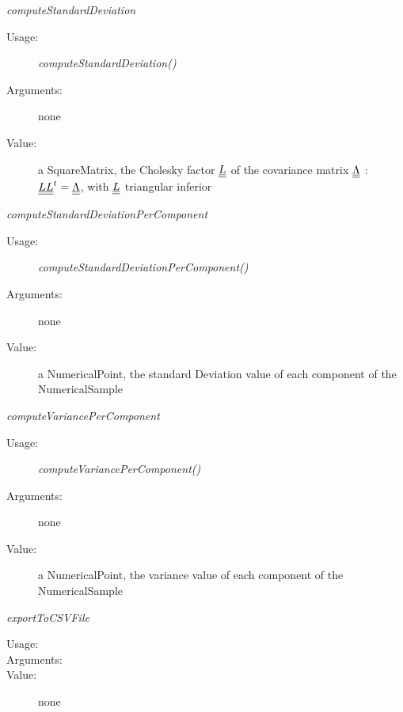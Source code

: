 \begin{description}
\begin{description}
\item \textit{computeStandardDeviation}
\begin{description}
\item[Usage:] \textit{computeStandardDeviation()}
\item[Arguments:] none
\item[Value:] a SquareMatrix, the Cholesky factor ${\underline{\underline{L}}}$ of the  covariance matrix ${\underline{\underline{\Lambda}}}$ : ${\underline{\underline{L}}}{\underline{\underline{L}}}^t = {\underline{\underline{\Lambda}}}$, with ${\underline{\underline{L}}}$ triangular inferior
\end{description}
\bigskip

\item \textit{computeStandardDeviationPerComponent}
\begin{description}
\item[Usage:] \textit{computeStandardDeviationPerComponent()}
\item[Arguments:] none
\item[Value:] a NumericalPoint, the standard Deviation value of each component of the NumericalSample
\end{description}
\bigskip

\item \textit{computeVariancePerComponent}
\begin{description}
\item[Usage:] \textit{computeVariancePerComponent()}
\item[Arguments:] none
\item[Value:] a NumericalPoint, the variance value of each component of the NumericalSample
\end{description}
\bigskip

\item \textit{exportToCSVFile}
\begin{description}
\item[Usage:]
\item[Arguments:]
\item[Value:] none
\end{description}
\bigskip


\end{description}
\end{description}
